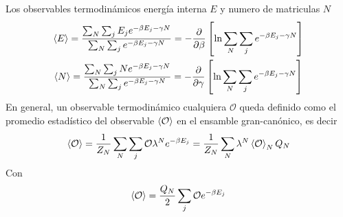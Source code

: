 \documentclass{article}
\begin{document}
Los observables termodinámicos energía interna $ E  $ y numero de matriculas $ N  $
\begin{gather*}
   \expval{E } = \frac{\sum_{N }^{} \sum_{j }^{} E_j e ^ {-\beta E_j - \gamma N }}{\sum_{N }^{} \sum_{j }^{} e ^ {-\beta E_j - \gamma N }} = - \frac{\partial  }{\partial \beta } \left[\ln \displaystyle\sum_{N }^{} \displaystyle\sum_{j }^{} e ^ {-\beta E_j - \gamma N }\right] 
   \\
   \expval{N } = \frac{\sum_{N }^{} \sum_{j }^{} N e ^ {-\beta E_j - \gamma N }}{\sum_{N }^{} \sum_{j }^{} e ^ {-\beta E_j - \gamma N }} = - \frac{\partial  }{\partial \gamma } \left[\ln \displaystyle\sum_{N }^{} \displaystyle\sum_{j }^{} e ^ {-\beta E_j - \gamma N }\right]
\end{gather*}
En general, un observable termodinámico cualquiera $ \mathcal O  $ queda definido como el promedio estadístico del observable $ \expval{\mathcal O } $ en el ensamble gran-canónico, es decir 
\begin{gather*}
  \expval{\mathcal O } 
  = \frac{1}{Z_N } \displaystyle\sum_{N }^{} \displaystyle\sum_{j }^{} \mathcal O \lambda^N e ^ {- \beta E_j } 
  = \frac{1}{Z_N } \displaystyle\sum_{N }^{} \lambda^N \expval{\mathcal O }_N Q_N  
\end{gather*}
Con 
\begin{gather*}
  \expval{\mathcal O } 
  = \frac{Q_N }{2} \displaystyle\sum_{j }^{} \mathcal O e ^ {- \beta E_j } 
\end{gather*}
\end{document}
